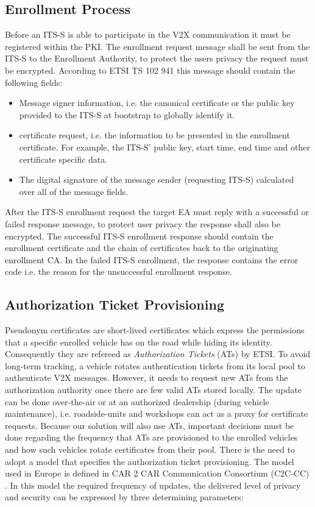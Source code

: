 \subsection{Enrollment Process}

Before an ITS-S is able to participate in the V2X communication it must be registered within the PKI. The enrollment request message shall be sent from the ITS-S to the Enrollment Authority, to protect the users privacy the request must be encrypted. According to ETSI TS 102 941 \cite{etsi_privacy} this message should contain the following fields:
\begin{itemize}
	\item{ Message signer information, i.e. the canonical certificate or the public key provided to the ITS-S at bootstrap to globally identify it.}
	\item{ certificate request, i.e. the information to be presented in the enrollment certificate. For example, the ITS-S' public key, start time, end time and other certificate specific data.}
	\item{ The digital signature of the message sender (requesting ITS-S) calculated over all of the message fields.}
\end{itemize}
After the ITS-S enrollment request the target EA must reply with a successful or failed response message, to protect user privacy the response shall also be encrypted. The successful ITS-S enrollment response should contain the enrollment certificate and the chain of certificates back to the originating enrollment CA. In the failed ITS-S enrollment, the response contains the error code i.e. the reason for the unsuccessful enrollment response. 


\subsection{Authorization Ticket Provisioning}
\label{section:at_usage}

Pseudonym certificates are short-lived certificates which express the permissions that a specific enrolled vehicle has on the road while hiding its identity. Consequently they are refereed as \textit{Authorization Tickets} (ATs) by ETSI. To avoid long-term tracking, a vehicle rotates authentication tickets from its local pool to authenticate V2X messages. However, it needs to request new ATs from the authorization authority once there are few valid ATs stored locally. The update can be done over-the-air or at an authorized dealership (during vehicle maintenance), i.e. roadside-units and workshops can act as a proxy for certificate requests. Because our solution will also use ATs, important decisions must be done regarding the frequency that ATs are provisioned to the enrolled vehicles and how such vehicles rotate certificates from their pool. There is the need to adopt a model that specifies the authorization ticket provisioning. The model used in Europe is defined in CAR 2 CAR Communication Consortium (C2C-CC) \cite{generic_eu}. In this model the required frequency of updates, the delivered level of privacy and security can be expressed by three determining parameters:

